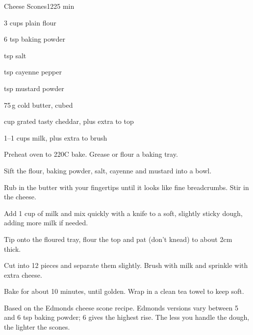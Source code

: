 \begin{recipebox}{Cheese Scones}{12}{25 min}
\begin{ingredients}
  \item 3 cups plain flour
  \item 6 tsp baking powder
  \item {} tsp salt
  \item {} tsp cayenne pepper
  \item {} tsp mustard powder
  \item 75\,g cold butter, cubed
  \item {} cup grated tasty cheddar, plus extra to top
  \item 1--1 cups milk, plus extra to brush
\end{ingredients}

\begin{method}
  \item Preheat oven to 220\degree C bake. Grease or flour a baking tray.
  \item Sift the flour, baking powder, salt, cayenne and mustard into a bowl.
  \item Rub in the butter with your fingertips until it looks like fine breadcrumbs. Stir in the cheese.
  \item Add 1 cup of milk and mix quickly with a knife to a soft, slightly sticky dough, adding more milk if needed.
  \item Tip onto the floured tray, flour the top and pat (don't knead) to about 2cm thick.
  \item Cut into 12 pieces and separate them slightly. Brush with milk and sprinkle with extra cheese.
  \item Bake for about 10 minutes, until golden. Wrap in a clean tea towel to keep soft.
\end{method}

\begin{notes}
Based on the Edmonds cheese scone recipe. Edmonds versions vary between 5 and 6 tsp baking powder; 6 gives the highest rise.
The less you handle the dough, the lighter the scones.
\end{notes}
\end{recipebox}
